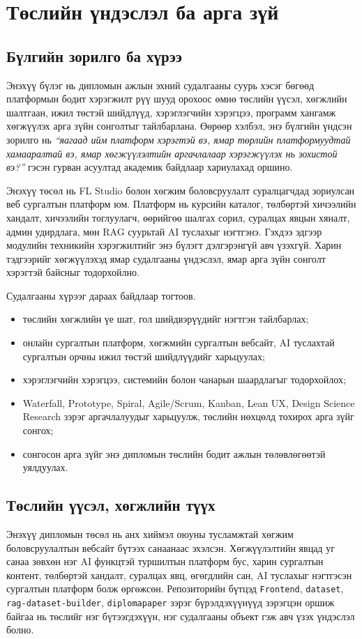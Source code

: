 
\chapter{Төслийн үндэслэл ба арга зүй}
\label{Chapter1}

\section{Бүлгийн зорилго ба хүрээ}
Энэхүү бүлэг нь дипломын ажлын эхний судалгааны суурь хэсэг бөгөөд платформын бодит хэрэгжилт рүү шууд орохоос өмнө төслийн үүсэл, хөгжлийн шалтгаан, ижил төстэй шийдлүүд, хэрэглэгчийн хэрэгцээ, программ хангамж хөгжүүлэх арга зүйн сонголтыг тайлбарлана. Өөрөөр хэлбэл, энэ бүлгийн үндсэн зорилго нь \textit{“яагаад ийм платформ хэрэгтэй вэ, ямар төрлийн платформуудтай хамааралтай вэ, ямар хөгжүүлэлтийн аргачлалаар хэрэгжүүлэх нь зохистой вэ?”} гэсэн гурван асуултад академик байдлаар хариулахад оршино.

Энэхүү төсөл нь FL Studio болон хөгжим боловсруулалт суралцагчдад зориулсан веб сургалтын платформ юм. Платформ нь курсийн каталог, төлбөртэй хичээлийн хандалт, хичээлийн тоглуулагч, өөрийгөө шалгах сорил, суралцах явцын хяналт, админ удирдлага, мөн RAG суурьтай AI туслахыг нэгтгэнэ. Гэхдээ эдгээр модулийн техникийн хэрэгжилтийг энэ бүлэгт дэлгэрэнгүй авч үзэхгүй. Харин тэдгээрийг хөгжүүлэхэд ямар судалгааны үндэслэл, ямар арга зүйн сонголт хэрэгтэй байсныг тодорхойлно.

Судалгааны хүрээг дараах байдлаар тогтоов.
\begin{itemize}
  \item төслийн хөгжлийн үе шат, гол шийдвэрүүдийг нэгтгэн тайлбарлах;
  \item онлайн сургалтын платформ, хөгжмийн сургалтын вебсайт, AI туслахтай сургалтын орчны ижил төстэй шийдлүүдийг харьцуулах;
  \item хэрэглэгчийн хэрэгцээ, системийн болон чанарын шаардлагыг тодорхойлох;
  \item Waterfall, Prototype, Spiral, Agile/Scrum, Kanban, Lean UX, Design Science Research зэрэг аргачлалуудыг харьцуулж, төслийн нөхцөлд тохирох арга зүйг сонгох;
  \item сонгосон арга зүйг энэ дипломын төслийн бодит ажлын төлөвлөгөөтэй уялдуулах.
\end{itemize}

\section{Төслийн үүсэл, хөгжлийн түүх}
Энэхүү дипломын төсөл нь анх хиймэл оюуны тусламжтай хөгжим боловсруулалтын вебсайт бүтээх санаанаас эхэлсэн. Хөгжүүлэлтийн явцад уг санаа зөвхөн нэг AI функцтэй туршилтын платформ бус, харин сургалтын контент, төлбөртэй хандалт, суралцах явц, өгөгдлийн сан, AI туслахыг нэгтгэсэн сургалтын платформ болж өргөжсөн. Репозиторийн бүтцэд \texttt{Frontend}, \texttt{dataset}, \texttt{rag-dataset-builder}, \texttt{diplomapaper} зэрэг бүрэлдэхүүнүүд зэрэгцэн оршиж байгаа нь төслийг нэг бүтээгдэхүүн, нэг судалгааны объект гэж авч үзэх үндэслэл болно.

